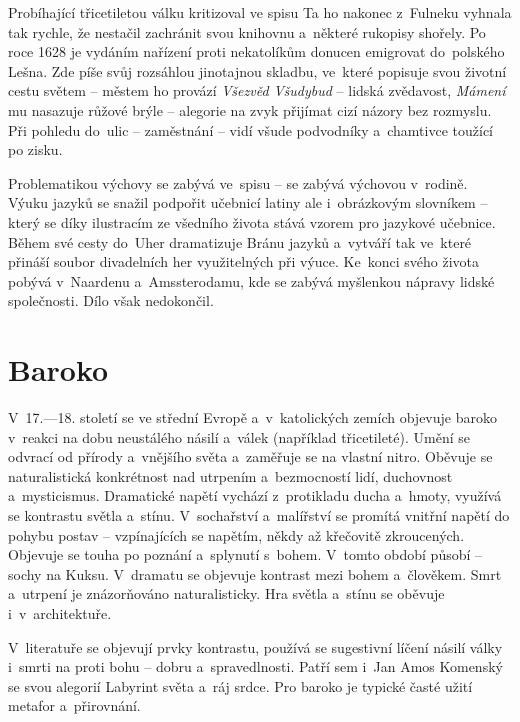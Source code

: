 Probíhající třicetiletou válku kritizoval ve spisu  Ta ho nakonec 
z~Fulneku vyhnala tak rychle, že nestačil zachránit svou knihovnu a~některé rukopisy shořely. Po roce 1628 je vydáním
nařízení proti nekatolíkům donucen emigrovat do~polského Lešna.
Zde píše svůj  rozsáhlou jinotajnou skladbu, ve~které popisuje svou životní
cestu světem -- městem ho provází \textit{Všezvěd Všudybud} -- lidská zvědavost, \textit{Mámení} mu nasazuje 
růžové brýle -- alegorie na zvyk přijímat cizí názory bez rozmyslu. Při pohledu do~ulic -- zaměstnání -- vidí
všude podvodníky a~chamtivce toužící po zisku.

Problematikou výchovy se zabývá ve~spisu  -- 
 se zabývá výchovou v~rodině. Výuku jazyků se snažil podpořit učebnicí latiny
 ale i~obrázkovým slovníkem  --  který se díky 
ilustracím ze všedního života stává vzorem pro jazykové učebnice. Během své cesty do~Uher dramatizuje 
Bránu jazyků a~vytváří tak  ve~které přináší soubor divadelních her využitelných při výuce. 
Ke~konci svého života pobývá v~Naardenu a~Amssterodamu, kde se zabývá myšlenkou nápravy lidské společnosti. 
Dílo  však nedokončil.

\section{Baroko}
V~17.---18. století se ve střední Evropě a~v~katolických zemích objevuje baroko v~reakci na dobu neustálého
násilí a~válek (například třicetileté). Umění se odvrací od přírody a~vnějšího světa a~zaměřuje se na vlastní
nitro. Oběvuje se naturalistická konkrétnost nad utrpením a~bezmocností lidí, duchovnost a~mysticismus.
Dramatické napětí vychází z~protikladu ducha a~hmoty, využívá se kontrastu světla a~stínu.
V~sochařství a~malířství se promítá vnitřní napětí do pohybu postav -- vzpínajících se napětím, někdy až křečovitě
zkroucených. Objevuje se touha po poznání a~splynutí s~bohem. V~tomto období působí  -- sochy na Kuksu.
V~dramatu se objevuje kontrast mezi bohem a~člověkem. Smrt a~utrpení je znázorňováno naturalisticky.
Hra světla a~stínu se oběvuje i~v~architektuře. 

V~literatuře se objevují prvky kontrastu, používá se sugestivní líčení násilí války i~smrti na proti bohu -- 
dobru a~spravedlnosti. Patří sem i~Jan Amos Komenský se svou alegorií Labyrint světa a~ráj srdce.
Pro baroko je typické časté užití metafor a~přirovnání. 

